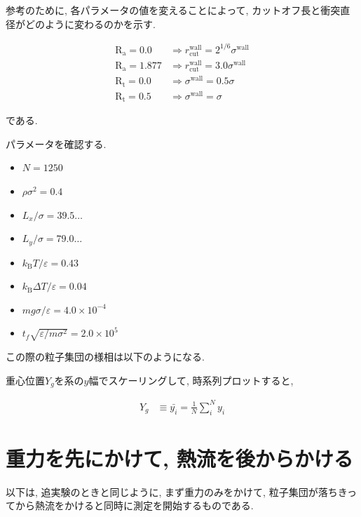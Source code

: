 \vspace{1\baselineskip}

参考のために, 各パラメータの値を変えることによって, カットオフ長と衝突直径がどのように変わるのかを示す.

\begin{align}
  \text{R}_\text{a} = 0.0 &\Rightarrow r_{\text{cut}}^{\text{wall}} = 2^{1/6} \sigma^{\text{wall}} \\
  \text{R}_\text{a} = 1.877 &\Rightarrow r_{\text{cut}}^{\text{wall}} = 3.0 \sigma^{\text{wall}} \\
  \text{R}_\text{t} = 0.0 &\Rightarrow \sigma^{\text{wall}} = 0.5 \sigma \\
  \text{R}_\text{t} = 0.5 &\Rightarrow \sigma^{\text{wall}} = \sigma 
\end{align}

である. 

パラメータを確認する.

\begin{itemize}
  \item $N = 1250$
  \item $\rho {\sigma}^2 = 0.4$
  \item $L_x / \sigma = 39.5\dots$
  \item $L_y / \sigma = 79.0\dots$
  \item $k_{\text{B}} T / \varepsilon = 0.43$
  \item $k_{\text{B}} \Delta T / \varepsilon = 0.04$
  \item $mg\sigma/\varepsilon = 4.0 \times 10^{-4}$
  \item $t_f \sqrt{\varepsilon / m \sigma^2} = 2.0 \times 10^{5}$
\end{itemize}

この際の粒子集団の様相は以下のようになる.



重心位置$Y_g$を系の$y$幅でスケーリングして, 時系列プロットすると,

\begin{align}
  Y_g &\equiv \bar{y_i} = \frac{1}{N} \sum_{i}^{N} y_i
\end{align}




\section{重力を先にかけて, 熱流を後からかける}

以下は, 追実験のときと同じように, まず重力のみをかけて, 粒子集団が落ちきってから熱流をかけると同時に測定を開始するものである.

